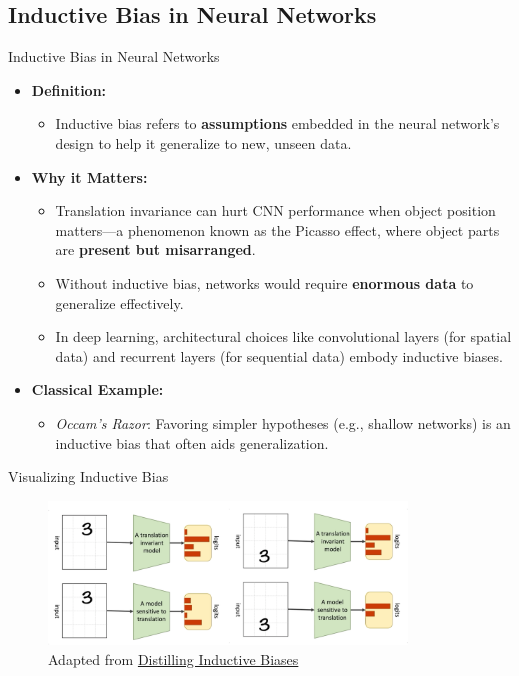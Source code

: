 \documentclass[serif, aspectratio=169]{beamer}
\begin{document}
\subsection{Inductive Bias in Neural Networks}

\begin{frame}{Inductive Bias in Neural Networks}
    \begin{itemize}
        \item \textbf{Definition:} 
            \begin{itemize}
                \item Inductive bias refers to \textbf{assumptions} embedded in the neural network's design to help it generalize to new, unseen data.
            \end{itemize}
        \item \textbf{Why it Matters:} 
            \begin{itemize}
            \item Translation invariance can hurt CNN performance when object position matters—a phenomenon known as the Picasso effect, where object parts are \textbf{present but misarranged}.
                \item Without inductive bias, networks would require \textbf{enormous data} to generalize effectively.
                \item In deep learning, architectural choices like convolutional layers (for spatial data) and recurrent layers (for sequential data) embody inductive biases.
            \end{itemize}
        \item \textbf{Classical Example:} 
            \begin{itemize}
                \item \textit{Occam's Razor}: Favoring simpler hypotheses (e.g., shallow networks) is an inductive bias that often aids generalization.
            \end{itemize}
    \end{itemize}
\end{frame}


\begin{frame}{Visualizing Inductive Bias}
\begin{figure}
        \centering
        \includegraphics[width=0.85\textwidth]{pic/invariant-variant.png}
        \caption{Adapted from \href{https://samiraabnar.github.io/articles/2020-05/indist}{Distilling Inductive Biases}}
    \end{figure}
\end{frame}
\end{document}
